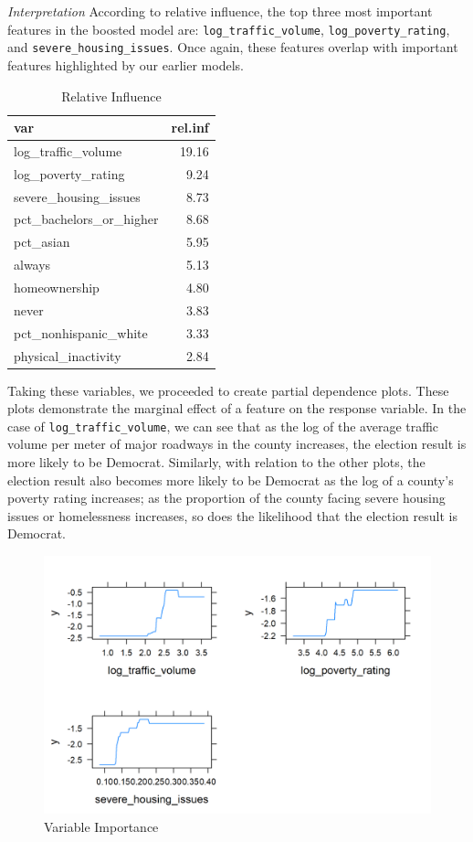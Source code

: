 \documentclass[
]{article}
\begin{document}
\emph{Interpretation}
According to relative influence, the top three most important features in the boosted model are:
\texttt{log\_traffic\_volume}, \texttt{log\_poverty\_rating}, and \texttt{severe\_housing\_issues}. Once again, these features overlap with important features highlighted by our earlier models.

\begin{table}

\caption{\label{tab:rel-inf}Relative Influence}
\centering
\begin{tabular}[t]{lr}
\toprule
var & rel.inf\\
\midrule
log\_traffic\_volume & 19.16\\
log\_poverty\_rating & 9.24\\
severe\_housing\_issues & 8.73\\
pct\_bachelors\_or\_higher & 8.68\\
pct\_asian & 5.95\\
\addlinespace
always & 5.13\\
homeownership & 4.80\\
never & 3.83\\
pct\_nonhispanic\_white & 3.33\\
physical\_inactivity & 2.84\\
\bottomrule
\end{tabular}
\end{table}

Taking these variables, we proceeded to create partial dependence plots. These plots demonstrate the marginal effect of a feature on the response variable. In the case of \texttt{log\_traffic\_volume}, we can see that as the log of the average traffic volume per meter of major roadways in the county increases, the election result is more likely to be Democrat. Similarly, with relation to the other plots, the election result also becomes more likely to be Democrat as the log of a county's poverty rating increases; as the proportion of the county facing severe housing issues or homelessness increases, so does the likelihood that the election result is Democrat.

\begin{figure}

{\centering \includegraphics[width=0.8\linewidth]{../results/part-dep-plots} 

}

\caption{Variable Importance}\label{fig:part-dep-plots}
\end{figure}
\end{document}
